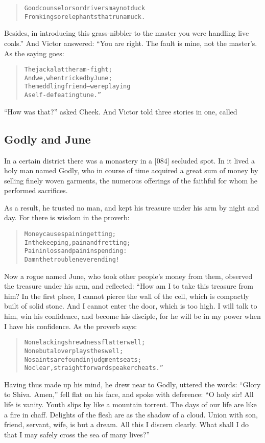 \documentclass[article, twoside, 14pt]{memoir}
\renewenvironment{verbatim}{%
\begin{quote}%
\vskip -10pt%
\begin{alltt}\normalfont\large}{\end{alltt}%
\end{quote}%
\vskip -10pt
} %
\begin{document}
\begin{verbatim}
Good counselors or drivers may not duck
From kings or elephants that run amuck.
\end{verbatim}
Besides, in introducing this grass-nibbler to the master you were
handling live coals.” And Victor answered: “You are right. The
fault is mine, not the master's. As the saying goes:

\begin{verbatim}
The jackal at the ram-fight;
    And we, when tricked by June;
The meddling friend--were playing
    A self-defeating tune.”
\end{verbatim}
``How was that?'' asked Cheek. And Victor told three stories in
one, called

\subsection{Godly and June}

\label{s5}

In a certain district there was a monastery in a [084] secluded
spot. In it lived a holy man named Godly, who in course of time
acquired a great sum of money by selling finely woven garments, the
numerous offerings of the faithful for whom he performed
sacrifices.

As a result, he trusted no man, and kept his treasure under his arm
by night and day. For there is wisdom in the proverb:

\begin{verbatim}
Money causes pain in getting;
In the keeping, pain and fretting;
Pain in loss and pain in spending:
Damn the trouble never ending!
\end{verbatim}
Now a rogue named June, who took other people's money from them,
observed the treasure under his arm, and reflected: “How am I to
take this treasure from him? In the first place, I cannot pierce
the wall of the cell, which is compactly built of solid stone. And
I cannot enter the door, which is too high. I will talk to him, win
his confidence, and become his disciple, for he will be in my power
when I have his confidence. As the proverb says:

\begin{verbatim}
None lacking shrewdness flatter well;
None but a lover plays the swell;
No saints are found in judgment seats;
No clear, straightforward speaker cheats.”
\end{verbatim}
Having thus made up his mind, he drew near to Godly, uttered the
words: ``Glory to Shiva. Amen,'' fell flat on his face, and spoke
with deference:
``O holy sir! All life is vanity. Youth slips by like a mountain torrent. The days of our life are like a fire in chaff. Delights of the flesh are as the shadow of a cloud. Union with son, friend, servant, wife, is but a dream. All this I discern clearly. What shall I do that I may safely cross the sea of many lives?''
\end{document}
